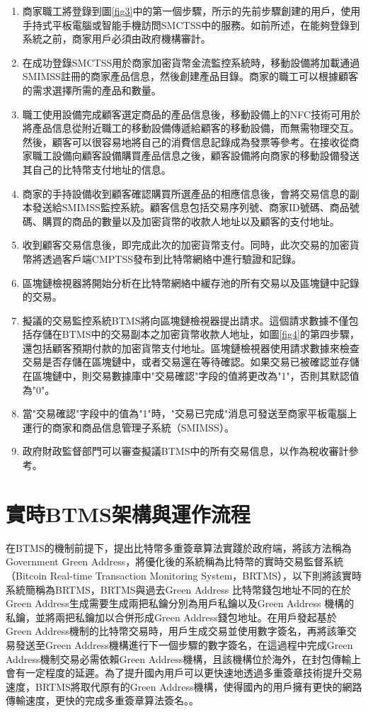 		\begin{enumerate}
			\item 商家職工將登錄到圖\ref{fig3}中的第一個步驟，所示的先前步驟創建的用戶，使用手持式平板電腦或智能手機訪問SMCTSS中的服務。如前所述，在能夠登錄到系統之前，商家用戶必須由政府機構審計。
			\item 在成功登錄SMCTSS用於商家加密貨幣金流監控系統時，移動設備將加載通過SMIMSS註冊的商家產品信息，然後創建產品目錄。商家的職工可以根據顧客的需求選擇所需的產品和數量。

			\item 職工使用設備完成顧客選定商品的產品信息後，移動設備上的NFC技術可用於將產品信息從附近職工的移動設備傳遞給顧客的移動設備，而無需物理交互。然後，顧客可以很容易地將自己的消費信息記錄成為發票等參考。在接收從商家職工設備向顧客設備購買產品信息之後，顧客設備將向商家的移動設備發送其自己的比特幣支付地址的信息。
			\item 商家的手持設備收到顧客確認購買所選產品的相應信息後，會將交易信息的副本發送給SMIMSS監控系統。顧客信息包括交易序列號、商家ID號碼、商品號碼、購買的商品的數量以及加密貨幣的收款人地址以及顧客的支付地址。
			\item 收到顧客交易信息後，即完成此次的加密貨幣支付。同時，此次交易的加密貨幣將透過客戶端CMPTSS發布到比特幣網絡中進行驗證和記錄。
			\item 區塊鏈檢視器將開始分析在比特幣網絡中緩存池的所有交易以及區塊鏈中記錄的交易。
			\item 擬議的交易監控系統BTMS將向區塊鏈檢視器提出請求。這個請求數據不僅包括存儲在BTMS中的交易副本之加密貨幣收款人地址，如圖\ref{fig4}的第四步驟，還包括顧客預期付款的加密貨幣支付地址。區塊鏈檢視器使用請求數據來檢查交易是否存儲在區塊鏈中，或者交易還在等待確認。如果交易已被確認並存儲在區塊鏈中，則交易數據庫中"交易確認"字段的值將更改為"1"，否則其默認值為"0"。
			\item 當"交易確認"字段中的值為"1"時，"交易已完成"消息可發送至商家平板電腦上運行的商家和商品信息管理子系統（SMIMSS）。
			\item 政府財政監督部門可以審查擬議BTMS中的所有交易信息，以作為稅收審計參考。
		\end{enumerate}

\section{實時BTMS架構與運作流程}

		在BTMS的機制前提下，提出比特幣多重簽章算法實踐於政府端，將該方法稱為Government Green Address，將優化後的系統稱為比特幣的實時交易監督系統（Bitcoin Real-time Transaction Monitoring System，BRTMS），以下則將該實時系統簡稱為BRTMS，BRTMS與過去Green Address 比特幣錢包地址不同的在於Green Address生成需要生成兩把私鑰分別為用戶私鑰以及Green Address 機構的私鑰，並將兩把私鑰加以合併形成Green Address錢包地址。在用戶發起基於Green Address機制的比特幣交易時，用戶生成交易並使用數字簽名，再將該筆交易發送至Green Address機構進行下一個步驟的數字簽名，在這過程中完成Green Address機制交易必需依賴Green Address機構，且該機構位於海外，在封包傳輸上會有一定程度的延遲。為了提升國內用戶可以更快速地透過多重簽章技術提升交易速度，BRTMS將取代原有的Green Address機構，使得國內的用戶擁有更快的網路傳輸速度，更快的完成多重簽章算法簽名。\supercite{tanet}。 

